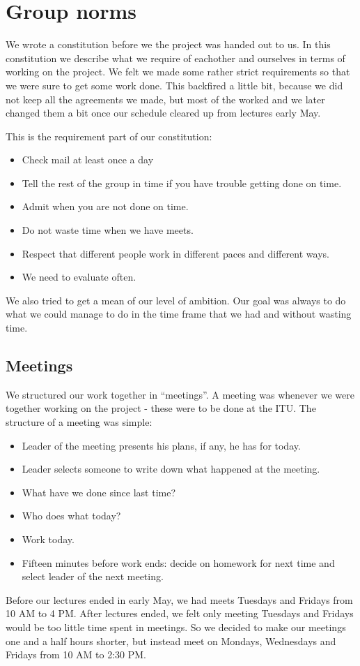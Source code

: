 \chapter{Group norms}
We wrote a constitution before we the project was handed out to us. In this
constitution we describe what we require of eachother and ourselves in terms of
working on the project. We felt we made some rather strict requirements so that
we were sure to get some work done. This backfired a little bit, because we did
not keep all the agreements we made, but most of the worked and we later changed
them a bit once our schedule cleared up from lectures early May.

This is the requirement part of our constitution:
\begin{itemize}
  \item Check mail at least once a day
  \item Tell the rest of the group in time if you have trouble getting done on
  time.
  \item Admit when you are not done on time.
  \item Do not waste time when we have meets.
  \item Respect that different people work in different paces and different
  ways.
  \item We need to evaluate often.
\end{itemize}

We also tried to get a mean of our level of ambition. Our goal was always to do
what we could manage to do in the time frame that we had and without wasting
time. 
\section{Meetings}
\label{GN-M}
We structured our work together in ``meetings''. A meeting was whenever we were
together working on the project - these were to be done at the ITU. The
structure of a meeting was simple:
\begin{itemize}
  \item Leader of the meeting presents his plans, if any, he has for today. 
  \item Leader selects someone to write down what happened at the meeting.
  \item What have we done since last time?
  \item Who does what today?
  \item Work today.
  \item Fifteen minutes before work ends: decide on homework for next time and
  select leader of the next meeting.
\end{itemize}
Before our lectures ended in early May, we had meets Tuesdays and Fridays from
10 AM to 4 PM. After lectures ended, we felt only meeting Tuesdays and Fridays
would be too little time spent in meetings. So we decided to make our meetings
one and a half hours shorter, but instead meet on Mondays, Wednesdays and
Fridays from 10 AM to 2:30 PM.
